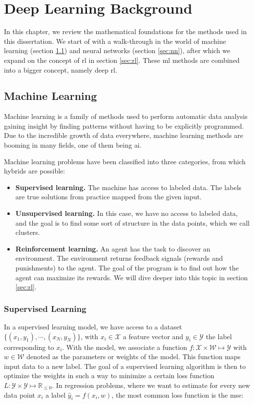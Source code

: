 \chapter{Deep Learning Background}
\label{ch:background}

In this chapter, we review the mathematical foundations for the methods used in this dissertation. We start of with a walk-through in the world of machine learning (section \ref{sec:ml}) and neural networks (section \ref{sec:nn}), after which we expand on the concept of \acrlong{rl} in section \ref{sec:rl}. These \acrlong{ml} methods are combined into a bigger concept, namely deep \acrlong{rl}.

\section{Machine Learning}
\label{sec:ml}
Machine learning is a family of methods used to perform automatic data analysis gaining insight by finding patterns without having to be explicitly programmed. Due to the incredible growth of data everywhere, machine learning methods are booming in many fields, one of them being \gls{ai}.

Machine learning problems have been classified into three categories, from which hybrids are possible:
\begin{itemize}
\item \textbf{Supervised learning.} The machine has access to labeled data. The labels are true solutions from practice mapped from the given input.
\item \textbf{Unsupervised learning.} In this case, we have no access to labeled data, and the goal is to find some sort of structure in the data points, which we call clusters. 
\item \textbf{Reinforcement learning.} An agent has the task to discover an environment. The environment returns feedback signals (rewards and punishments) to the agent. The goal of the program is to find out how the agent can maximize its rewards. We will dive deeper into this topic in section \ref{sec:rl}.
\end{itemize}

\subsection*{Supervised Learning}
In a supervised learning model, we have access to a dataset $\{(x_1,y_1),\cdots,(x_N,y_N)\}$, with $x_i\in\mathcal{X}$ a feature vector and $y_i\in\mathcal{Y}$ the label corresponding to $x_i$. With the model, we associate a function $f:\mathcal{X}\times\mathcal{W}\mapsto\mathcal{Y}$ with $w \in \mathcal{W}$ denoted as the parameters or weights of the model. This function maps input data to a new label. The goal of a supervised learning algorithm is then to optimize the weights in such a way to minimize a certain loss function $L:\mathcal{Y}\times\mathcal{Y}\mapsto\mathbb{R}_{\leq0}$. In regression problems, where we want to estimate for every new data point $x_i$ a label $\hat{y}_i=f(x_i,w)$, the most common loss function is the \gls{mse}:

